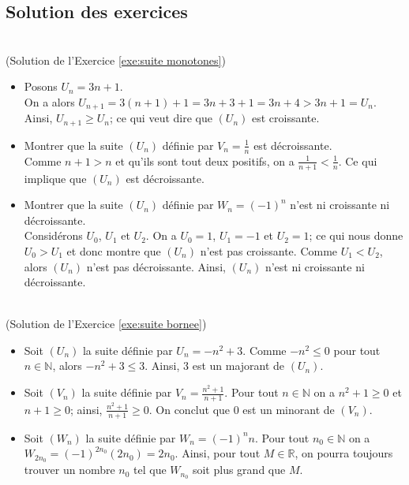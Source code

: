 \begin{corrige}
\section{Solution des exercices}
\begin{sol} ~ \\
\label{Sol:suite monotones}
(Solution de l'Exercice \ref{exe:suite monotones})
\begin{itemize} 
\item Posons $U_n = 3 n + 1 $. \\
      On a alors $U_{n+1} = 3 (n+1) + 1 = 3n+3+1 = 3n + 4 > 3n + 1 = U_n$.
      Ainsi, $U_{n+1} \geq U_n$; ce qui veut dire que $(U_n)$ est croissante.
\item Montrer que la suite $(U_n)$ d\'efinie par $V_n = \frac{1}{n} $ est d\'ecroissante. \\
      Comme $n + 1 > n$ et qu'ils sont tout deux positifs, on a $\frac{1}{n+1} < \frac{1}{n}$.
      Ce qui implique que $(U_n)$ est d\'ecroissante.
\item Montrer que la suite $(U_n)$ d\'efinie par $W_n = (-1)^n $ n'est ni croissante ni d\'ecroissante. \\
      Consid\'erons $U_0$, $U_1$ et $U_2$.
      On a $U_0 = 1$, $U_1 = -1$ et $U_2 = 1$; ce qui nous donne $U_0 > U_1$ et donc montre que $(U_n)$ n'est pas croissante.
      Comme $U_1 < U_2$, alors $(U_n)$ n'est pas d\'ecroissante.
      Ainsi, $(U_n)$ n'est ni croissante ni d\'ecroissante.
\end{itemize}
\end{sol}
%
\begin{sol} ~ \\
(Solution de l'Exercice \ref{exe:suite bornee})
\label{Sol:suite bornee}
\begin{itemize} 
\item Soit $(U_n)$ la suite d\'efinie par $U_n = -n^2 + 3 $.
      Comme $-n^2 \leq 0$ pour tout $n \in \mathbb{N}$, alors $-n^2 + 3 \leq 3$.
      Ainsi, $3$ est un majorant de $(U_n)$.
\item Soit $(V_n)$ la suite d\'efinie par $V_n = \frac{n^2 + 1}{n + 1} $.
      Pour tout $n \in \mathbb{N}$ on a $n^2 + 1 \geq 0$ et $n+1 \geq 0$; ainsi, $\frac{n^2 + 1}{n+1} \geq 0$.
      On conclut que $0$ est un minorant de $(V_n)$.
\item Soit $(W_n)$ la suite d\'efinie par $W_n = (-1)^n n $.
      Pour tout $n_0 \in \mathbb{N}$ on a $W_{2 n_0} = (-1)^{2 n_0} (2 n_0) = 2 n_0$.
      Ainsi, pour tout $M \in \mathbb{R}$, on pourra toujours trouver un nombre $n_0$ tel que $W_{n_0}$ soit plus grand que $M$.

\end{itemize}
\end{sol}
\end{corrige}
